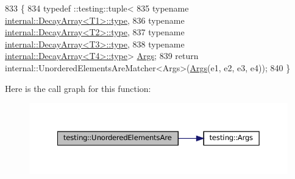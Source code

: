 \begin{DoxyCode}
833                                                                              \{
834   typedef ::testing::tuple<
835       \textcolor{keyword}{typename} \hyperlink{namespacegenerate__debs_a50bc9a7ecac9584553e089a448bcde58}{internal::DecayArray<T1>::type},
836       \textcolor{keyword}{typename} \hyperlink{namespacegenerate__debs_a50bc9a7ecac9584553e089a448bcde58}{internal::DecayArray<T2>::type},
837       \textcolor{keyword}{typename} \hyperlink{namespacegenerate__debs_a50bc9a7ecac9584553e089a448bcde58}{internal::DecayArray<T3>::type},
838       \textcolor{keyword}{typename} \hyperlink{namespacegenerate__debs_a50bc9a7ecac9584553e089a448bcde58}{internal::DecayArray<T4>::type}> 
      \hyperlink{namespacetesting_a09ac462e8d6ed468cbfaa9c767aee0aa}{Args};
839   \textcolor{keywordflow}{return} internal::UnorderedElementsAreMatcher<Args>(\hyperlink{namespacetesting_a09ac462e8d6ed468cbfaa9c767aee0aa}{Args}(e1, e2, e3, e4));
840 \}
\end{DoxyCode}
Here is the call graph for this function\+:
\nopagebreak
\begin{figure}[H]
\begin{center}
\leavevmode
\includegraphics[width=350pt]{namespacetesting_a8dfb2b88d0cacb8ececc069b0b015991_cgraph}
\end{center}
\end{figure}
\mbox{\label{namespacetesting_a5e0ff76eb3f61b6c79b60311ceca73d3}} 
